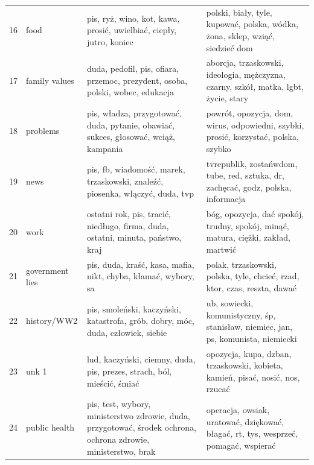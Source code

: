 \documentclass{article}
\begin{document}
\begin{otherlanguage}{polish}
\begin{longtable}{p{2cm}p{2cm}p{5cm}p{5cm}}
				16 &                     food &                                              pis, ryż, wino, kot, kawa, prosić, uwielbiać, ciepły, jutro, koniec &                                           polski, biały, tyle, kupować, polska, wódka, żona, sklep, wziąć, siedzieć dom \\
				17 &            family values &                                   duda, pedofil, pis, ofiara, przemoc, prezydent, osoba, polski, wobec, edukacja &                                    aborcja, trzaskowski, ideologia, mężczyzna, czarny, szkół, matka, lgbt, życie, stary \\
				18 &                 problems &                              pis, władza, przygotować, duda, pytanie, obawiać, sukces, głosować, wciąż, kampania &                                     powrót, opozycja, dom, wirus, odpowiedni, szybki, prosić, korzystać, polska, szybko \\
				19 &                     news &                                    pis, fb, wiadomość, marek, trzaskowski, znaleźć, piosenka, włączyć, duda, tvp &                                       tvrepublik, zostańwdom, tube, red, sztuka, dr, zachęcać, godz, polska, informacja \\
				20 &                     work &                                  ostatni rok, pis, tracić, niedługo, firma, duda, ostatni, minuta, państwo, kraj &                                       bóg, opozycja, dać spokój, trudny, spokój, minąć, matura, ciężki, zakład, martwić \\
				21 &          government lies &                                                   pis, duda, kraść, kasa, mafia, nikt, chyba, kłamać, wybory, sa &                                               polak, trzaskowski, polska, tyle, chcieć, rzad, ktor, czas, reszta, dawać \\
				22 &              history/WW2 &                                  pis, smoleński, kaczyński, katastrofa, grób, dobry, móc, duda, człowiek, siebie &                                      ub, sowiecki, komunistyczny, śp, stanisław, niemiec, jan, ps, komunista, niemiecki \\
				23 &                    unk 1 &                                           lud, kaczyński, ciemny, duda, pis, prezes, strach, ból, mieścić, śmiać &                                          opozycja, kupa, dzban, trzaskowski, kobieta, kamień, pisać, nosić, nos, rzucać \\
				24 &            public health &  pis, test, wybory, ministerstwo zdrowie, duda, przygotować, środek ochrona, ochrona zdrowie, ministerstwo, brak &                                     operacja, owsiak, uratować, dziękować, błagać, rt, tys, wesprzeć, pomagać, wspierać \\

\end{longtable}
\end{otherlanguage}
\end{document}

